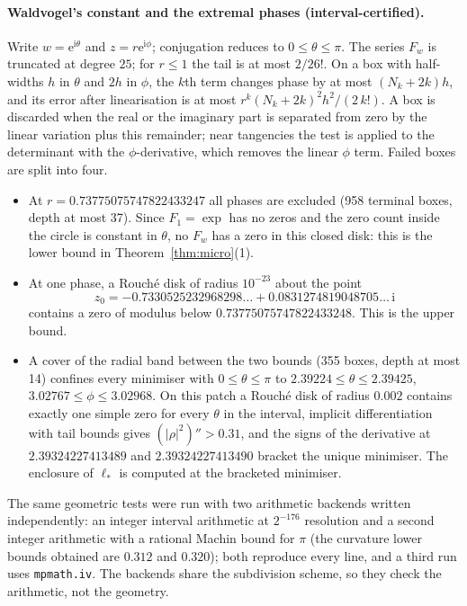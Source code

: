 \documentclass[11pt,a4paper]{article}
\theoremstyle{remark}
\newcommand{\e}{\mathrm e}
\newcommand{\ii}{\mathrm i}
\begin{document}
\paragraph{Waldvogel's constant and the extremal phases (interval-certified).} Write $w=\e^{\ii\theta}$ and $z=r\e^{\ii\phi}$; conjugation reduces to $0\le\theta\le\pi$. The series $F_w$ is truncated at degree $25$; for $r\le1$ the tail is at most $2/26!$. On a box with half-widths $h$ in $\theta$ and $2h$ in $\phi$, the $k$th term changes phase by at most $(N_k+2k)h$, and its error after linearisation is at most $r^k(N_k+2k)^2h^2/(2\,k!)$. A box is discarded when the real or the imaginary part is separated from zero by the linear variation plus this remainder; near tangencies the test is applied to the determinant with the $\phi$-derivative, which removes the linear $\phi$ term. Failed boxes are split into four.
\begin{itemize}
\item At $r=0.73775075747822433247$ all phases are excluded (958 terminal boxes, depth at most 37). Since $F_1=\exp$ has no zeros and the zero count inside the circle is constant in $\theta$, no $F_w$ has a zero in this closed disk: this is the lower bound in Theorem~\ref{thm:micro}(1).
\item At one phase, a Rouch\'e disk of radius $10^{-23}$ about the point
\[z_0=-0.7330525232968298\ldots+0.0831274819048705\ldots\,\ii\]
contains a zero of modulus below $0.73775075747822433248$. This is the upper bound.
\item A cover of the radial band between the two bounds (355 boxes, depth at most 14) confines every minimiser with $0\le\theta\le\pi$ to $2.39224\le\theta\le2.39425$, $3.02767\le\phi\le3.02968$. On this patch a Rouch\'e disk of radius $0.002$ contains exactly one simple zero for every $\theta$ in the interval, implicit differentiation with tail bounds gives $(|\rho|^2)''>0.31$, and the signs of the derivative at $2.39324227413489$ and $2.39324227413490$ bracket the unique minimiser. The enclosure of $\ell_*$ is computed at the bracketed minimiser.
\end{itemize}
The same geometric tests were run with two arithmetic backends written independently: an integer interval arithmetic at $2^{-176}$ resolution and a second integer arithmetic with a rational Machin bound for $\pi$ (the curvature lower bounds obtained are $0.312$ and $0.320$); both reproduce every line, and a third run uses \texttt{mpmath.iv}. The backends share the subdivision scheme, so they check the arithmetic, not the geometry.
\end{document}
